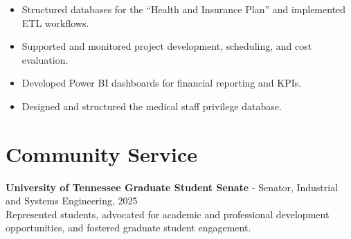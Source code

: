 \documentclass[10pt, letterpaper]{article}
\newenvironment{highlights}{
    \begin{itemize}[
        topsep=0.10 cm,
        parsep=0.10 cm,
        partopsep=0pt,
        itemsep=0pt,
        leftmargin=0 cm + 10pt
    ]
}{
    \end{itemize}
} %
\begin{document}
\begin{highlights}
    \item Structured databases for the “Health and Insurance Plan” and implemented ETL workflows.
    \item Supported and monitored project development, scheduling, and cost evaluation.
    \item Developed Power BI dashboards for financial reporting and KPIs.
    \item Designed and structured the medical staff privilege database.
\end{highlights}






\section*{Community Service}

\textbf{University of Tennessee Graduate Student Senate} - Senator, Industrial and Systems Engineering, 2025\\  

\small
Represented students, advocated for academic and professional development opportunities, and fostered graduate student engagement.
\end{document}
